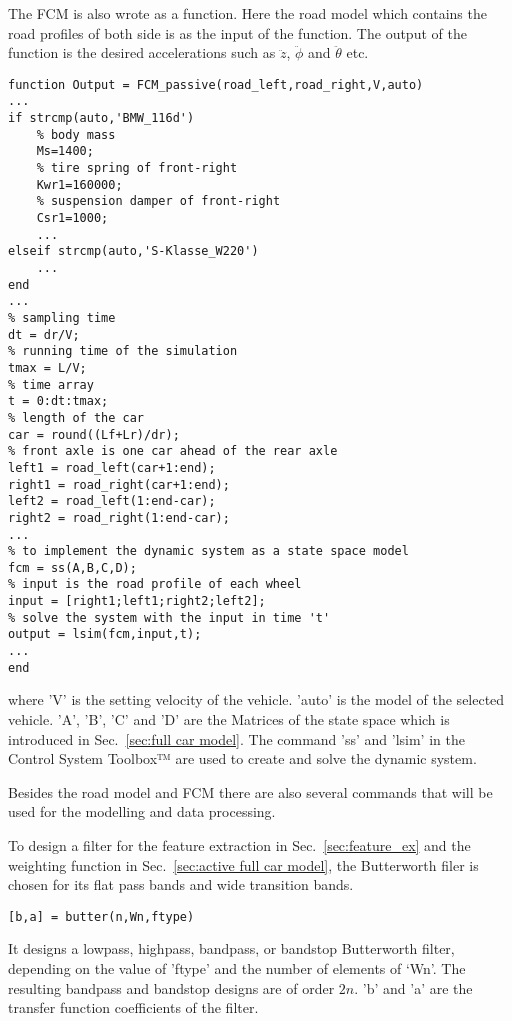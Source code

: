 The \ac{FCM} is also wrote as a function.
%
Here the road model which contains the road profiles of both side is as the input of the function.
%
The output of the function is the desired accelerations such as $\ddot{z}$, $\ddot{\phi}$ and $\ddot{\theta}$ etc.

\begin{lstlisting}[caption={Function of the \ac{FCM}},label=code:fcm]
function Output = FCM_passive(road_left,road_right,V,auto)
...
if strcmp(auto,'BMW_116d')
    % body mass
    Ms=1400;
    % tire spring of front-right
    Kwr1=160000;
    % suspension damper of front-right
    Csr1=1000;
    ...
elseif strcmp(auto,'S-Klasse_W220')
    ...
end
...
% sampling time
dt = dr/V;
% running time of the simulation
tmax = L/V;
% time array
t = 0:dt:tmax; 
% length of the car
car = round((Lf+Lr)/dr);
% front axle is one car ahead of the rear axle
left1 = road_left(car+1:end);
right1 = road_right(car+1:end);
left2 = road_left(1:end-car);
right2 = road_right(1:end-car);
...
% to implement the dynamic system as a state space model
fcm = ss(A,B,C,D);
% input is the road profile of each wheel
input = [right1;left1;right2;left2];
% solve the system with the input in time 't'
output = lsim(fcm,input,t);
...
end

\end{lstlisting}

where 'V' is the setting velocity of the vehicle.
%
'auto' is the model of the selected vehicle.
%
'A', 'B', 'C' and 'D' are the Matrices of the state space which is introduced in Sec.~\ref{sec:full car model}.
%
The command 'ss' and 'lsim' in the Control System Toolbox™ are used to create and solve the dynamic system.

Besides the road model and \ac{FCM} there are also several commands that will be used for the modelling and data processing.

To design a filter for the feature extraction in Sec.~\ref{sec:feature_ex} and the weighting function in Sec.~\ref{sec:active full car model}, the Butterworth filer is chosen for its flat pass bands and wide transition bands.

\begin{lstlisting}[caption={Butterworth filter design in Matlab},label=code:butter]
[b,a] = butter(n,Wn,ftype)
\end{lstlisting}

It designs a lowpass, highpass, bandpass, or bandstop Butterworth filter, depending on the value of 'ftype' and the number of elements of ‘Wn'.
%
The resulting bandpass and bandstop designs are of order $2n$.
%
'b' and 'a' are the transfer function coefficients of the filter.

